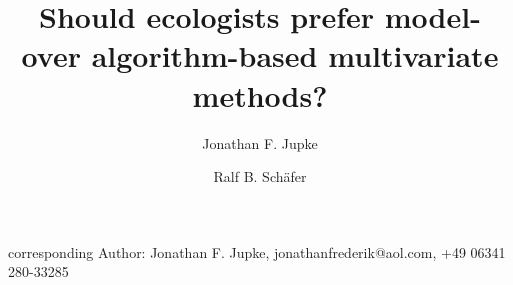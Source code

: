 \documentclass[a4paper,11pt]{article}
\begin{document}
\title{Should ecologists prefer model- over algorithm-based multivariate methods?}


\author[1]{Jonathan F. Jupke}
\author[1]{Ralf B. Schäfer}


    \maketitle
    corresponding Author: Jonathan F. Jupke, jonathanfrederik@aol.com,
    +49 06341 280-33285\\


    \newpage
\end{document}
